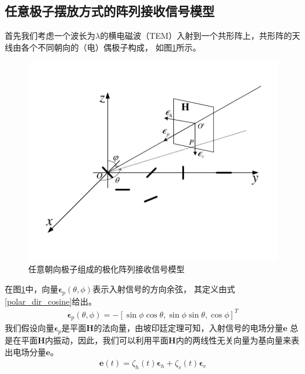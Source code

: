 \documentclass[master]{thesis-uestc}
\begin{document}
\subsection{任意极子摆放方式的阵列接收信号模型}
首先我们考虑一个波长为$\lambda$的横电磁波（TEM）入射到一个共形阵上，共形阵的天线由各个不同朝向的（电）偶极子构成，
如图\ref{polarized_array}所示。
\begin{figure}[h]
    \includegraphics[scale=0.8]{pic/polarized_array.pdf}
    \caption{任意朝向极子组成的极化阵列接收信号模型}
    \label{polarized_array}
\end{figure}
在图\ref{polarized_array}中，向量$\bm{\epsilon}_p(\theta,\phi)$表示入射信号的方向余弦，
其定义由式\eqref{polar_dir_cosine}给出。
\begin{equation}\label{polar_dir_cosine}
    \begin{aligned}
        \bm{\epsilon}_p(\theta,\phi) = 
        -\left[\sin\phi\cos\theta,\sin\phi\sin\theta,\cos\phi\right]^T
    \end{aligned}
\end{equation}
我们假设向量$\bm{\epsilon}_p$是平面$\bm{H}$的法向量，由坡印廷定理可知，入射信号的电场分量$\bm{e}$
总是在平面$\bm{H}$内振动，因此，我们可以利用平面$\bm{H}$内的两线性无关向量为基向量来表出电场分量$\bm{e}$。
\begin{equation}\label{polar_elect_comp}
    \begin{aligned}
        \bm{e}(t) = \zeta_h(t)\bm{\epsilon}_h + \zeta_v(t)\bm{\epsilon}_v
    \end{aligned}
\end{equation}
\end{document}
